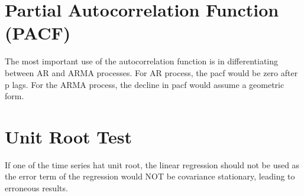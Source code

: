 \section{Partial Autocorrelation Function (PACF)}
The most important use of the autocorrelation function is in differentiating between AR and ARMA processes. For AR process, the pacf would be zero after p lags. For the ARMA process, the decline in pacf would assume a geometric form.

\section{Unit Root Test}
If one of the time series hat unit root, the linear regression should not be used as the error term of the regression would NOT be covariance stationary, leading to erroneous results.
